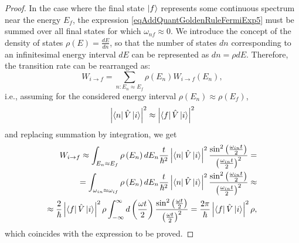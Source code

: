 \begin{proof}
  In the case where the final state $\ket{f}$ represents
  some continuous spectrum near the energy $E_f$, the expression
  \eqref{eqAddQuantGoldenRuleFermiExp5} must be summed over all final states
  for which $\omega_{nf} \approx 0$. We introduce the concept of the density of states
  $\rho(E) = \frac{dE}{dn}$, so that the number of states $dn$ corresponding
  to an infinitesimal energy interval $dE$ can be represented as
  $dn = \rho dE$. Therefore, the transition rate can be rearranged as:
  \begin{equation}
    W_{i \rightarrow f} = \sum_{n: E_n \approx E_f}
    \rho\left(E_n\right) W_{i \rightarrow f}\left(E_n\right), 
    \nonumber
  \end{equation}
  i.e., assuming for the considered energy interval
  $\rho\left(E_n\right) \approx \rho\left(E_f\right)$,
  \[
  \left|\bra{n}\hat{V}\ket{i}\right|^2 \approx
  \left|\bra{f}\hat{V}\ket{i}\right|^2
  \]
  and replacing summation by integration, we get
  \begin{eqnarray}
    W_{i \rightarrow f} \approx
    \int_{E_n \approx E_f} \rho\left(E_n\right) d E_n      \frac{t}{\hbar^2}
    \left|\bra{n}\hat{V}\ket{i}\right|^2
    \frac{\sin^2\left(\frac{ \omega_{in} t}{2}\right)}
         {\left(\frac{ \omega_{in} t}{2}\right)^2} =
         \\ \nonumber
         = \int_{\omega_{in} \approx \omega_{if}} \rho\left(E_n\right)
         d E_n      \frac{t}{\hbar^2}
    \left|\bra{n}\hat{V}\ket{i}\right|^2
    \frac{\sin^2\left(\frac{ \omega_{in} t}{2}\right)}
         {\left(\frac{ \omega_{in} t}{2}\right)^2} \approx
         \\ \nonumber
    \approx
    \frac{2}{\hbar}
    \left|\bra{f}\hat{V}\ket{i}\right|^2 \rho
    \int_{-\infty}^{\infty}
     d \left(\frac{ \omega t}{2}\right)
    \frac{\sin^2\left(\frac{ \omega t}{2}\right)}
         {\left(\frac{ \omega t}{2}\right)^2} =
    \frac{2 \pi}{\hbar} 
    \left|\bra{f}\hat{V}\ket{i}\right|^2 \rho,
    \label{eqAddQuantGoldenRuleFermiExp6}
  \end{eqnarray}
  which coincides with the expression to be proved.
  
  
\end{proof}